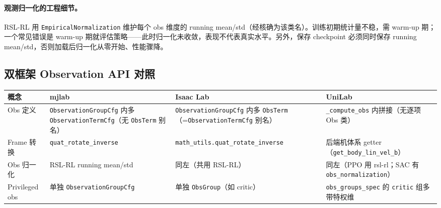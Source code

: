 \paragraph{观测归一化的工程细节。}RSL-RL 用 \verb|EmpiricalNormalization| 维护每个 obs 维度的 running mean/std（经核确为该类名）。训练初期统计量不稳，需 warm-up 期；一个常见错误是 warm-up 期就评估策略——此时归一化未收敛，表现不代表真实水平。另外，保存 checkpoint 必须同时保存 running mean/std，否则加载后归一化从零开始、性能骤降。

\subsection{双框架 Observation API 对照}
\label{sec:rlmc-wh-obs-api}

\begin{center}
\small
\begin{tabular}{@{}llll@{}}
\toprule
概念 & mjlab & Isaac Lab & UniLab \\
\midrule
Obs 定义 & \verb|ObservationGroupCfg| 内多 \verb|ObservationTermCfg|（无 \verb|ObsTerm| 别名） & \verb|ObservationGroupCfg| 内多 \verb|ObsTerm|（=\verb|ObservationTermCfg| 别名） & \verb|_compute_obs| 内拼接（无逐项 Obs 类） \\
Frame 转换 & \verb|quat_rotate_inverse| & \verb|math_utils.quat_rotate_inverse| & 后端机体系 getter（\verb|get_body_lin_vel_b|） \\
Obs 归一化 & RSL-RL running mean/std & 同左（共用 RSL-RL） & 同左（PPO 用 rsl-rl；SAC 有 \verb|obs_normalization|） \\
Privileged obs & 单独 \verb|ObservationGroupCfg| & 单独 \verb|ObsGroup|（如 critic） & \verb|obs_groups_spec| 的 \verb|critic| 组多带特权维 \\
\bottomrule
\end{tabular}
\end{center}

